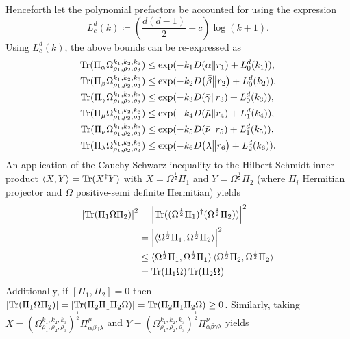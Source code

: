\documentclass[notitlepage, 10pt]{article}
\begin{document}
Henceforth let the polynomial prefactors be accounted for using the expression
\begin{equation}
    L^d_c(k) \coloneqq \left(\frac{d(d-1)}{2} + c\right)\log (k+1).
\end{equation}
Using $L^d_c(k)$, the above bounds can be re-expressed as
\begin{align}
    \operatorname{Tr}(\Pi_{\alpha} \Omega_{\rho_1,\rho_2,\rho_3}^{k_1, k_2, k_3}) &\leq \exp(-k_1 D\!\left(\bar \alpha\middle\|r_1\right) + L^d_0(k_1)), \\
    \operatorname{Tr}(\Pi_{\beta} \Omega_{\rho_1,\rho_2,\rho_3}^{k_1, k_2, k_3}) &\leq \exp(-k_2 D\!\left(\bar \beta\middle\|r_2\right) + L^d_0(k_2)), \\
    \operatorname{Tr}(\Pi_{\gamma} \Omega_{\rho_1,\rho_2,\rho_3}^{k_1, k_2, k_3}) &\leq \exp(-k_3 D\!\left(\bar \gamma\middle\|r_3\right) + L^d_0(k_3)), \\
    \operatorname{Tr}(\Pi_{\mu} \Omega_{\rho_1,\rho_2,\rho_3}^{k_1, k_2, k_3}) &\leq \exp(-k_4 D\!\left(\bar \mu\middle\|r_4\right) + L^d_1(k_4)), \\
    \operatorname{Tr}(\Pi_{\nu} \Omega_{\rho_1,\rho_2,\rho_3}^{k_1, k_2, k_3}) &\leq \exp(-k_5 D\!\left(\bar \nu\middle\|r_5\right) + L^d_1(k_5)), \\
    \operatorname{Tr}(\Pi_{\lambda} \Omega_{\rho_1,\rho_2,\rho_3}^{k_1, k_2, k_3}) &\leq \exp(-k_6 D\!\left(\bar \lambda\middle\|r_6\right) + L^d_2(k_6)).
\end{align}
An application of the Cauchy-Schwarz inequality to the Hilbert-Schmidt inner product $\braket{X,Y} = \operatorname{Tr}(X^{\dagger} Y)$ with $X = \Omega^{\frac{1}{2}}\Pi_1$ and $Y = \Omega^{\frac{1}{2}}\Pi_2$ (where $\Pi_i$ Hermitian projector and $\Omega$ positive-semi definite Hermitian) yields
\begin{align}
    \left|\operatorname{Tr}(\Pi_1 \Omega \Pi_2)\right|^2 
    &= \left|\operatorname{Tr}((\Omega^{\frac{1}{2}}\Pi_1)^{\dagger}(\Omega^{\frac{1}{2}}\Pi_2))\right|^2 \\
    &= \left|\braket{\Omega^{\frac{1}{2}}\Pi_1, \Omega^{\frac{1}{2}}\Pi_2}\right|^{2} \\
    &\leq \braket{\Omega^{\frac{1}{2}}\Pi_1, \Omega^{\frac{1}{2}}\Pi_1}\braket{\Omega^{\frac{1}{2}}\Pi_2, \Omega^{\frac{1}{2}}\Pi_2} \\
    &= \operatorname{Tr}(\Pi_1 \Omega)\operatorname{Tr}(\Pi_2 \Omega)
\end{align}
Additionally, if $[\Pi_1, \Pi_2]=0$ then $\left|\operatorname{Tr}(\Pi_1 \Omega \Pi_2)\right| = \left|\operatorname{Tr}(\Pi_2\Pi_1\Pi_2\Omega)\right| = \operatorname{Tr}(\Pi_2\Pi_1\Pi_2\Omega) \geq 0$.
Similarly, taking $X = \left(\Omega_{\rho_1,\rho_2,\rho_3}^{k_1, k_2, k_3}\right)^{\frac{1}{2}}\Pi^{\mu}_{\alpha\beta\gamma\lambda}$ and $Y = \left(\Omega_{\rho_1,\rho_2,\rho_3}^{k_1, k_2, k_3}\right)^{\frac{1}{2}}\Pi^{\nu}_{\alpha\beta\gamma\lambda}$ yields
\end{document}
